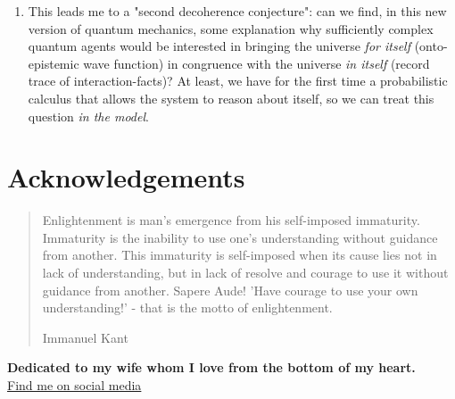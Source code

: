 \documentclass{article}
\begin{document}
\begin{enumerate}
\item This leads me to a "second decoherence conjecture": can we find, in this new version of quantum mechanics, some explanation why sufficiently complex quantum agents would be interested in bringing the universe \textit{for itself} (onto-epistemic wave function) in congruence with the universe \textit{in itself} (record trace of interaction-facts)? At least, we have for the first time a probabilistic calculus that allows the system to reason about itself, so we can treat this question \textit{in the model}.

\end{enumerate}

\pagebreak

\section{Acknowledgements}

\blockquote[Immanuel Kant]{
Enlightenment is man's emergence from his self-imposed immaturity. Immaturity is the inability to use one’s understanding without guidance from another. This immaturity is self-imposed when its cause lies not in lack of understanding, but in lack of resolve and courage to use it without guidance from another. Sapere Aude! 'Have courage to use your own understanding!' - that is the motto of enlightenment.
}

\textbf{Dedicated to my wife whom I love from the bottom of my heart.}\\

\href{https://x.com/comradeKangaroo}{Find me on social media}

\pagebreak

\printbibliography
\end{document}
